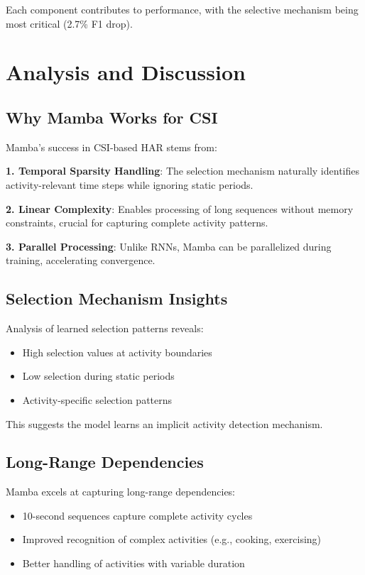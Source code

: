\documentclass[10pt,conference]{IEEEtran}
\begin{document}
Each component contributes to performance, with the selective mechanism being most critical (2.7\% F1 drop).

\section{Analysis and Discussion}
\label{sec:discussion}

\subsection{Why Mamba Works for CSI}

Mamba's success in CSI-based HAR stems from:

\textbf{1. Temporal Sparsity Handling}: The selection mechanism naturally identifies activity-relevant time steps while ignoring static periods.

\textbf{2. Linear Complexity}: Enables processing of long sequences without memory constraints, crucial for capturing complete activity patterns.

\textbf{3. Parallel Processing}: Unlike RNNs, Mamba can be parallelized during training, accelerating convergence.

\subsection{Selection Mechanism Insights}

Analysis of learned selection patterns reveals:
\begin{itemize}
    \item High selection values at activity boundaries
    \item Low selection during static periods
    \item Activity-specific selection patterns
\end{itemize}

This suggests the model learns an implicit activity detection mechanism.

\subsection{Long-Range Dependencies}

Mamba excels at capturing long-range dependencies:
\begin{itemize}
    \item 10-second sequences capture complete activity cycles
    \item Improved recognition of complex activities (e.g., cooking, exercising)
    \item Better handling of activities with variable duration
\end{itemize}
\end{document}
